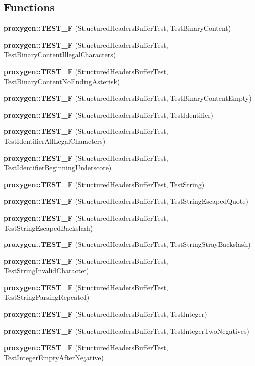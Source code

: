 \subsection*{Functions}
\begin{DoxyCompactItemize}
\item 
{\bf proxygen\+::\+T\+E\+S\+T\+\_\+F} (Structured\+Headers\+Buffer\+Test, Test\+Binary\+Content)
\item 
{\bf proxygen\+::\+T\+E\+S\+T\+\_\+F} (Structured\+Headers\+Buffer\+Test, Test\+Binary\+Content\+Illegal\+Characters)
\item 
{\bf proxygen\+::\+T\+E\+S\+T\+\_\+F} (Structured\+Headers\+Buffer\+Test, Test\+Binary\+Content\+No\+Ending\+Asterisk)
\item 
{\bf proxygen\+::\+T\+E\+S\+T\+\_\+F} (Structured\+Headers\+Buffer\+Test, Test\+Binary\+Content\+Empty)
\item 
{\bf proxygen\+::\+T\+E\+S\+T\+\_\+F} (Structured\+Headers\+Buffer\+Test, Test\+Identifier)
\item 
{\bf proxygen\+::\+T\+E\+S\+T\+\_\+F} (Structured\+Headers\+Buffer\+Test, Test\+Identifier\+All\+Legal\+Characters)
\item 
{\bf proxygen\+::\+T\+E\+S\+T\+\_\+F} (Structured\+Headers\+Buffer\+Test, Test\+Identifier\+Beginning\+Underscore)
\item 
{\bf proxygen\+::\+T\+E\+S\+T\+\_\+F} (Structured\+Headers\+Buffer\+Test, Test\+String)
\item 
{\bf proxygen\+::\+T\+E\+S\+T\+\_\+F} (Structured\+Headers\+Buffer\+Test, Test\+String\+Escaped\+Quote)
\item 
{\bf proxygen\+::\+T\+E\+S\+T\+\_\+F} (Structured\+Headers\+Buffer\+Test, Test\+String\+Escaped\+Backslash)
\item 
{\bf proxygen\+::\+T\+E\+S\+T\+\_\+F} (Structured\+Headers\+Buffer\+Test, Test\+String\+Stray\+Backslash)
\item 
{\bf proxygen\+::\+T\+E\+S\+T\+\_\+F} (Structured\+Headers\+Buffer\+Test, Test\+String\+Invalid\+Character)
\item 
{\bf proxygen\+::\+T\+E\+S\+T\+\_\+F} (Structured\+Headers\+Buffer\+Test, Test\+String\+Parsing\+Repeated)
\item 
{\bf proxygen\+::\+T\+E\+S\+T\+\_\+F} (Structured\+Headers\+Buffer\+Test, Test\+Integer)
\item 
{\bf proxygen\+::\+T\+E\+S\+T\+\_\+F} (Structured\+Headers\+Buffer\+Test, Test\+Integer\+Two\+Negatives)
\item 
{\bf proxygen\+::\+T\+E\+S\+T\+\_\+F} (Structured\+Headers\+Buffer\+Test, Test\+Integer\+Empty\+After\+Negative)

\end{DoxyCompactItemize}
